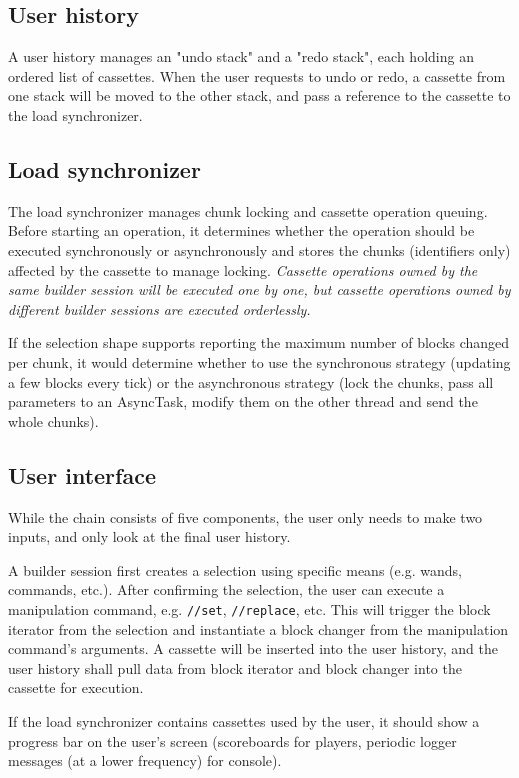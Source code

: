 \documentclass{report}
\begin{document}
			\subsection{User history}
				A user history manages an "undo stack" and a "redo stack", each holding an ordered list of cassettes.
				When the user requests to undo or redo, a cassette from one stack will be moved to the other stack, and
				pass a reference to the cassette to the load synchronizer.

			\subsection{Load synchronizer}
				The load synchronizer manages chunk locking and cassette operation queuing. Before starting an
				operation, it determines whether the operation should be executed synchronously or asynchronously and
				stores the chunks (identifiers only) affected by the cassette to manage locking. \emph{Cassette
				operations owned by the same builder session will be executed one by one, but cassette operations owned
				by different builder sessions are executed orderlessly.}

				If the selection shape supports reporting the maximum number of blocks changed per chunk, it would
				determine whether to use the synchronous strategy (updating a few blocks every tick) or the
				asynchronous strategy (lock the chunks, pass all parameters to an AsyncTask, modify them on the other
				thread and send the whole chunks).

			\subsection{User interface}
				While the chain consists of five components, the user only needs to make two inputs, and only look at
				the final user history.

				A builder session first creates a selection using specific means (e.g. wands, commands, etc.). After
				confirming the selection, the user can execute a manipulation command, e.g. \texttt{//set},
				\texttt{//replace}, etc. This will trigger the block iterator from the selection and instantiate a
				block changer from the manipulation command's arguments. A cassette will be inserted into the user
				history, and the user history shall pull data from block iterator and block changer into the cassette
				for execution.

				If the load synchronizer contains cassettes used by the user, it should show a progress bar on the
				user's screen (scoreboards for players, periodic logger messages (at a lower frequency) for console).
\end{document}

